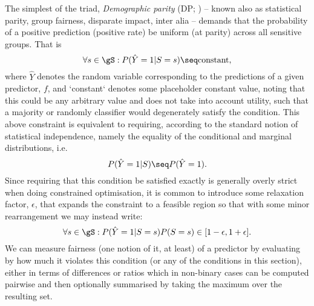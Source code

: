 %
The simplest of the triad, \emph{Demographic parity} (\ac{DP}; \cite{zemel2013learning,
feldman2015certifying}) -- known also as statistical parity, group fairness, disparate impact,
inter alia -- demands that the probability of a positive prediction (positive rate) be uniform
(at parity) across all sensitive groups. 
%
That is
%
\begin{equation}
    \forall s \in \gS: P( \hat{Y} = 1 | S = s ) \seq \text{constant},
\end{equation}
%
where \(\hat{Y}\) denotes the random variable corresponding to the predictions of a given
predictor, \(f\), and `constant` denotes some placeholder constant value, noting that this could be
any arbitrary value and does not take into account utility, such that a majority or randomly
classifier would degenerately satisfy the condition. 
%
This above constraint is equivalent to requiring, according to the standard notion of statistical
independence, namely the equality of the conditional and marginal distributions, i.e.
%
\begin{equation}
    P( \hat{Y} = 1 | S) \seq P( \hat{Y} = 1 ).
\end{equation}
%
%
Since requiring that this condition be satisfied exactly is generally overly strict when doing
constrained optimisation, it is common to introduce some relaxation factor, \(\epsilon\), that
expands the constraint to a feasible region so that with some minor rearrangement we may instead
write:
%
\begin{equation}
    \forall s \in \gS: P(\hat{Y}=1|S=s) P(S=s) \in [ 1 - \epsilon, 1 + \epsilon ]. 
%
\end{equation}
%
We can measure fairness (one notion of it, at least) of a predictor by evaluating by how much it
violates this condition (or any of the conditions in this section), either in terms of differences
or ratios  which in non-binary cases can be computed pairwise and then optionally summarised by
taking the maximum over the resulting set.

